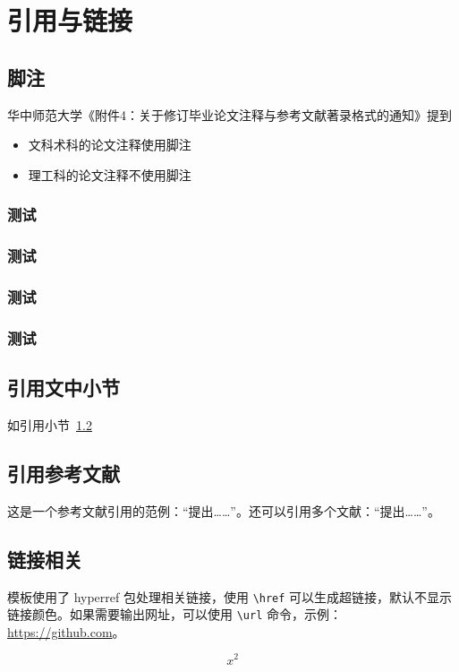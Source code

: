 
\chapter{引用与链接}

\section{脚注}

华中师范大学《附件4：关于修订毕业论文注释与参考文献著录格式的通知》提到

\begin{itemize}
  \item 文科术科的论文注释使用脚注
  \item 理工科的论文注释不使用脚注
\end{itemize}

\subsection{测试}
\subsection{测试}
\subsection{测试}
\subsection{测试}

\zhlipsum[1]



\section{引用文中小节}\label{sec:ref}

如引用小节~\ref{sec:ref}



\section{引用参考文献}

这是一个参考文献引用的范例：“\parencite{邱泽奇建构与分化}提出……”。还可以引用多个文献：“\parencite{丁文祥rawtype,李晓东rawtype}提出……”。


\section{链接相关}


模板使用了 hyperref 包处理相关链接，使用 \verb|\href| 可以生成超链接，默认不显示链接颜色。如果需要输出网址，可以使用 \verb|\url| 命令，示例：\url{https://github.com}。


\begin{equation}
  x^2
\end{equation}